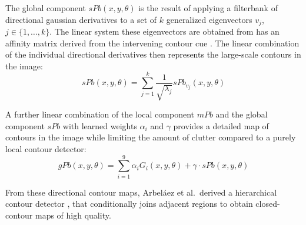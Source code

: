 The global component $sPb(x, y, \theta)$ is the result of applying a
filterbank of directional gaussian derivatives to a set of $k$ generalized
eigenvectors $v_j$, $j \in \{1, \dots, k\}$. The linear system these eigenvectors
are obtained from has an affinity matrix derived from the intervening contour
cue \autocite{fowlkes_learning_2003}. The linear combination of the individual
directional derivatives then represents the large-scale contours in the image:
\begin{equation*}
    sPb(x, y, \theta) = \sum_{j=1}^k \frac{1}{\sqrt{\lambda_j}} sPb_{v_j}(x, y, \theta)
\end{equation*}

A further linear combination of the local component $mPb$ and the global
component $sPb$ with learned weights $\alpha_i$ and $\gamma$ provides a
detailed map of contours in the image while limiting the amount of clutter
compared to a purely local contour detector:
\begin{equation*}
    gPb(x, y, \theta) = \sum_{i=1}^9 \alpha_i G_i(x, y, \theta) + \gamma \cdot sPb(x, y, \theta)
\end{equation*}

From these directional contour maps, Arbeláez et al.\ derived a hierarchical
contour detector \autocite{arbelaez_contours_2009}, that conditionally joins
adjacent regions to obtain closed-contour maps of high quality.
